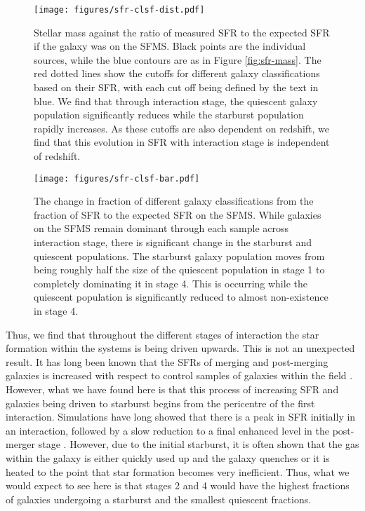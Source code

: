 \documentclass[fleqn,usenatbib]{mnras}
\begin{document}
\begin{figure}
    \centering
    \texttt{[image: figures/sfr-clsf-dist.pdf]}
    \caption{Stellar mass against the ratio of measured SFR to the expected SFR if the galaxy was on the SFMS. Black points are the individual sources, while the blue contours are as in Figure \ref{fig:sfr-mass}. The red dotted lines show the cutoffs for different galaxy classifications based on their SFR, with each cut off being defined by the text in blue. We find that through interaction stage, the quiescent galaxy population significantly reduces while the starburst population rapidly increases. As these cutoffs are also dependent on redshift, we find that this evolution in SFR with interaction stage is independent of redshift.}
    \label{fig:sfr-clsf}
\end{figure}

\begin{figure}
    \centering
    \texttt{[image: figures/sfr-clsf-bar.pdf]}
    \caption{The change in fraction of different galaxy classifications from the fraction of SFR to the expected SFR on the SFMS. While galaxies on the SFMS remain dominant through each sample across interaction stage, there is significant change in the starburst and quiescent populations. The starburst galaxy population moves from being roughly half the size of the quiescent population in stage 1 to completely dominating it in stage 4. This is occurring while the quiescent population is significantly reduced to almost non-existence in stage 4.}
    \label{fig:sfr-clsf-bar}
\end{figure}

Thus, we find that throughout the different stages of interaction the star formation within the systems is being driven upwards. This is not an unexpected result. It has long been known that the SFRs of merging and post-merging galaxies is increased with respect to control samples of galaxies within the field \citep{papers saying this}. However, what we have found here is that this process of increasing SFR and galaxies being driven to starburst begins from the pericentre of the first interaction. Simulations have long showed that there is a peak in SFR initially in an interaction, followed by a slow reduction to a final enhanced level in the post-merger stage \citep{papers saying this}. However, due to the initial starburst, it is often shown that the gas within the galaxy is either quickly used up and the galaxy quenches or it is heated to the point that star formation becomes very inefficient. Thus, what we would expect to see here is that stages 2 and 4 would have the highest fractions of galaxies undergoing a starburst and the smallest quiescent fractions.
\end{document}
